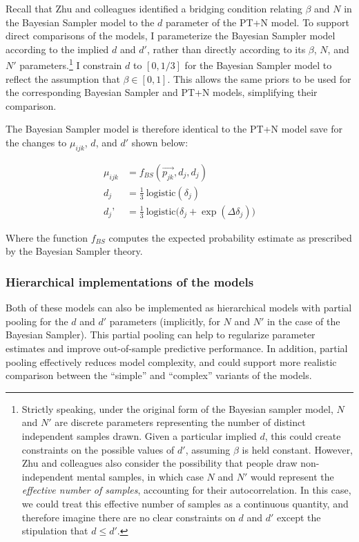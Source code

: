 \documentclass[
  man,floatsintext]{apa6}
\begin{document}
Recall that Zhu and colleagues \autocite*{zhu.etal2020} identified a bridging condition relating \(\beta\) and \(N\) in the Bayesian Sampler model to the \(d\) parameter of the PT+N model. To support direct comparisons of the models, I parameterize the Bayesian Sampler model according to the implied \(d\) and \(d'\), rather than directly according to its \(\beta\), \(N\), and \(N'\) parameters.\footnote{Strictly speaking, under the original form of the Bayesian sampler model, \(N\) and \(N'\) are discrete parameters representing the number of distinct independent samples drawn. Given a particular implied \(d\), this could create constraints on the possible values of \(d'\), assuming \(\beta\) is held constant. However, Zhu and colleagues \autocite*{zhu.etal2020} also consider the possibility that people draw non-independent mental samples, in which case \(N\) and \(N'\) would represent the \emph{effective number of samples}, accounting for their autocorrelation. In this case, we could treat this effective number of samples as a continuous quantity, and therefore imagine there are no clear constraints on \(d\) and \(d'\) except the stipulation that \(d \leq d'\).} I constrain \(d\) to \([0, 1/3]\) for the Bayesian Sampler model to reflect the assumption that \(\beta \in [0, 1]\). This allows the same priors to be used for the corresponding Bayesian Sampler and PT+N models, simplifying their comparison.

The Bayesian Sampler model is therefore identical to the PT+N model save for the changes to \(\mu_{ijk}\), \(d\), and \(d'\) shown below:

\begin{align*}
  \mu_{ijk} &= f_{BS}(\overrightarrow{p_{jk}}, d_j, d_j)  \\
  d_j &= \frac{1}{3} \ \text{logistic}(\delta_j) \\
  d_j’ &= \frac{1}{3} \ \text{logistic}\big(\delta_j + \exp(\Delta\delta_j)\big)
\end{align*}

Where the function \(f_{BS}\) computes the expected probability estimate as prescribed by the Bayesian Sampler theory.

\hypertarget{hierarchical-implementations-of-the-models}{%
\subsubsection{Hierarchical implementations of the models}\label{hierarchical-implementations-of-the-models}}

Both of these models can also be implemented as hierarchical models with partial pooling for the \(d\) and \(d'\) parameters (implicitly, for \(N\) and \(N'\) in the case of the Bayesian Sampler). This partial pooling can help to regularize parameter estimates and improve out-of-sample predictive performance. In addition, partial pooling effectively reduces model complexity, and could support more realistic comparison between the ``simple'' and ``complex'' variants of the models.
\end{document}
